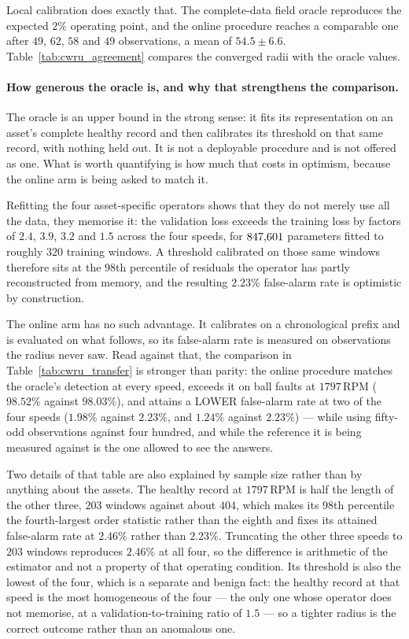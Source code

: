 \documentclass[a4paper]{cas-sc}
\begin{document}
Local calibration does exactly that. The complete-data field oracle reproduces
the expected \(2\%\) operating point, and the online procedure reaches a
comparable one after \(49\), \(62\), \(58\) and \(49\) observations, a mean of
\(54.5\pm 6.6\). Table~\ref{tab:cwru_agreement} compares the converged radii
with the oracle values.

\paragraph{How generous the oracle is, and why that strengthens the comparison.}
The oracle is an upper bound in the strong sense: it fits its representation
on an asset's complete healthy record and then calibrates its threshold on
that same record, with nothing held out. It is not a deployable procedure and
is not offered as one. What is worth quantifying is how much that costs in
optimism, because the online arm is being asked to match it.

Refitting the four asset-specific operators shows that they do not merely use
all the data, they memorise it: the validation loss exceeds the training loss
by factors of \(2.4\), \(3.9\), \(3.2\) and \(1.5\) across the four speeds,
for \(847{,}601\) parameters fitted to roughly \(320\) training windows. A
threshold calibrated on those same windows therefore sits at the \(98\)th
percentile of residuals the operator has partly reconstructed from memory,
and the resulting \(2.23\%\) false-alarm rate is optimistic by construction.

The online arm has no such advantage. It calibrates on a chronological prefix
and is evaluated on what follows, so its false-alarm rate is measured on
observations the radius never saw. Read against that, the comparison in
Table~\ref{tab:cwru_transfer} is stronger than parity: the online procedure
matches the oracle's detection at every speed, exceeds it on ball faults at
\(1797\,\mathrm{RPM}\) (\(98.52\%\) against \(98.03\%\)), and attains a LOWER
false-alarm rate at two of the four speeds (\(1.98\%\) against \(2.23\%\), and
\(1.24\%\) against \(2.23\%\)) --- while using fifty-odd observations against
four hundred, and while the reference it is being measured against is the one
allowed to see the answers.

Two details of that table are also explained by sample size rather than by
anything about the assets. The healthy record at \(1797\,\mathrm{RPM}\) is
half the length of the other three, \(203\) windows against about \(404\),
which makes its \(98\)th percentile the fourth-largest order statistic rather
than the eighth and fixes its attained false-alarm rate at \(2.46\%\) rather
than \(2.23\%\). Truncating the other three speeds to \(203\) windows
reproduces \(2.46\%\) at all four, so the difference is arithmetic of the
estimator and not a property of that operating condition. Its threshold is
also the lowest of the four, which is a separate and benign fact: the healthy
record at that speed is the most homogeneous of the four --- the only one whose
operator does not memorise, at a validation-to-training ratio of \(1.5\) ---
so a tighter radius is the correct outcome rather than an anomalous one.
\end{document}

